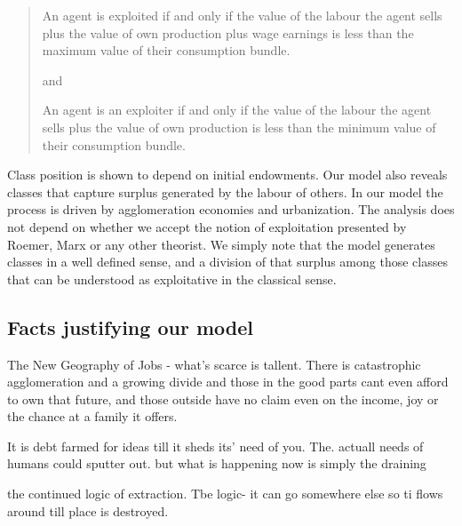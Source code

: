 \begin{quotation}

An agent is exploited  if and only if the value of the labour the agent sells plus the value of own production plus wage earnings is less than the maximum value of their consumption bundle.\vspace{.25cm}

and\vspace{.25cm}

An agent is an exploiter  if and only if the value of the labour the agent sells plus the value of own production is less than the minimum value of their consumption bundle.
\end{quotation}

Class position is shown to depend on initial endowments. 
Our model also reveals classes that capture surplus generated by the labour of others. In our model the process is driven by agglomeration economies and urbanization. The analysis does not depend on whether we accept the notion of exploitation presented by Roemer, Marx or any other theorist. We simply note that the model generates classes in a well defined sense, and a division of that surplus among those classes that can be understood  as exploitative in the  classical sense. 







\subsection{Facts justifying our model}

The New Geography of Jobs - what's scarce is tallent. There is catastrophic agglomeration and a growing divide
and those in the good parts cant even afford to own that future, and those outside have no claim even on the income, joy or the chance at a family it offers.

It is debt farmed for ideas till it sheds its' need of you. 
The. actuall needs of humans could sputter out. but what is happening now is simply the draining

the continued logic of extraction.
Tbe logic- it can go somewhere else so ti flows around till place is destroyed. 

